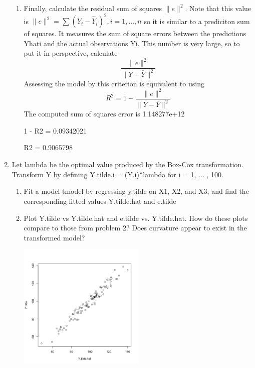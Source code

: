 \documentclass[11pt]{article}
\begin{document}
\begin{enumerate}
\begin{enumerate}
\item 
Finally, calculate the residual sum of squares $\|e\|^2$. Note that this 
value is 
$\| e \|^2 = \sum (Y_i - \hat{Y}_i)^2, i = 1, ... , n$ 
so it is similar to a prediciton sum of squares. It measures the sum of 
square errors between the predictions Yhati and the actual observations Yi. 
This number is very large, so to put it in perspective, calculate 
\begin{equation}
\frac{
                          \|e\|^2
}{
                       \| Y - \bar{Y}\|^2
}
\end{equation}
       Assessing the model by this criterion is equivalent to using 
\begin{equation}
R^2 = 1 - 
\frac{
                          \|e\|^2
}{
                       \| Y - \bar{Y}\|^2
}
\end{equation}
	The computed sum of squares error is 1.148277e+12

	1 - R2 = 0.09342021

	R2 =  0.9065798
\end{enumerate}

\item 
Let lambda be the optimal value produced by the Box-Cox transformation. 
Transform Y by defining Y.tilde.i = (Y.i)\verb|^|lambda for i = 1, ... , 100.

\begin{enumerate}
\item 
Fit a model tmodel by regressing y.tilde on X1, X2, and X3, and find the 
corresponding fitted values Y.tilde.hat and e.tilde

\item 
Plot Y.tilde vs Y.tilde.hat and e.tilde vs. Y.tilde.hat. How do these plots 
compare to those from problem 2? Does curvature appear to exist in the 
transformed model? 

\begin{center}
\includegraphics[width=0.5\textwidth]{Ytilde_vs_Ytildehat}
\end{center}
	

\end{enumerate}
\end{enumerate}
\end{document}
